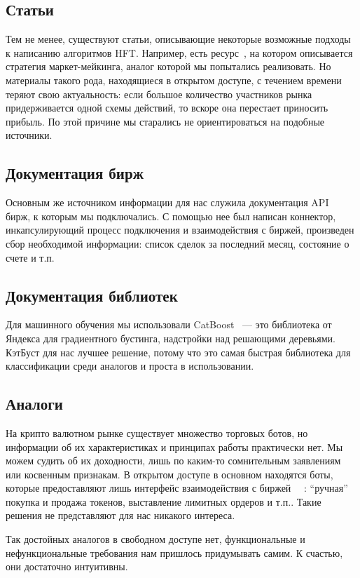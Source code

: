 \subsection{Статьи}
Тем не менее, существуют статьи, описывающие некоторые возможные подходы к написанию алгоритмов HFT. Например, есть ресурс~\cite{HftBattle}, на котором описывается стратегия маркет-мейкинга, аналог которой мы попытались реализовать. Но материалы такого рода, находящиеся в открытом доступе, с течением времени теряют свою актуальность: если большое количество участников рынка придерживается одной схемы действий, то вскоре она перестает приносить прибыль. По этой причине мы старались не ориентироваться на подобные источники.
\subsection{Документация бирж}
Основным же источником информации для нас служила документация API~\cite{DydxDocs}~\cite{BinanceDocs} бирж, к которым мы подключались. С помощью нее был написан коннектор, инкапсулирующий процесс подключения и взаимодействия с биржей, произведен сбор необходимой информации: список сделок за последний месяц, состояние о счете и т.п.
\subsection{Документация библиотек}
Для машинного обучения мы использовали CatBoost~\cite{CatboostDocs} — это библиотека от Яндекса для градиентного бустинга, надстройки над решающими деревьями. КэтБуст для нас лучшее решение, потому что это самая быстрая библиотека для классификации среди аналогов и проста в использовании.

\subsection{Аналоги}
На крипто валютном рынке существует множество торговых ботов, но информации об их характеристиках и принципах работы практически нет. Мы можем судить об их доходности, лишь по каким-то сомнительным заявлениям или косвенным признакам. В открытом доступе в основном находятся боты, которые предоставляют лишь интерфейс взаимодействия с биржей ~\cite{CryptoTradingBot}~\cite{FreqTrade}: “ручная” покупка и продажа токенов, выставление лимитных ордеров и т.п.. Такие решения не представляют для нас никакого интереса.

Так достойных аналогов в свободном доступе нет, функциональные и нефункциональные требования нам пришлось придумывать самим. К счастью, они достаточно интуитивны.

